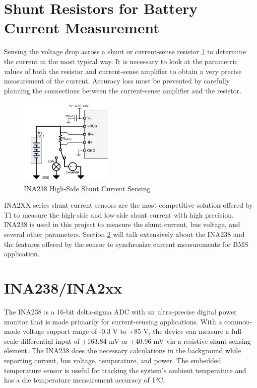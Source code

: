 \section{Shunt Resistors for Battery Current Measurement}
Sensing the voltage drop across a shunt or current-sense resistor \ref{fig:INA_high_side_currentsense} to determine the current in the most typical way. It is necessary to look at the parametric values of both the resistor and current-sense amplifier to obtain a very precise measurement of the current.
Accuracy loss must be prevented by carefully planning the connections between the current-sense amplifier and the resistor.
\begin{figure}[h]
	\centering
	\includegraphics[width=0.4\textwidth]{Chap05/Figures/INA_high_side_currentsense.PNG}
	\caption{ INA238 High-Side Shunt Current Sensing} 
	\label{fig:INA_high_side_currentsense}
\end{figure}

INA2XX series shunt current sensors are the most competitive solution offered by TI to measure the high-side and low-side shunt current with high precision. INA238 is used in this project to measure the shunt current, bus voltage, and several other parameters. Section \ref{sec:INA238} will talk extensively about the INA238 and the features offered by the sensor to synchronize current measurements for BMS application.
\section{INA238/INA2xx}\label{sec:INA238}
The INA238 is a 16-bit delta-sigma ADC with an ultra-precise digital power monitor that is made primarily for current-sensing applications. With a common-mode voltage support range of -0.3 V to +85 V, the device can measure a full-scale differential input of $\pm$163.84 mV or $\pm$40.96 mV via a resistive shunt sensing element.
The INA238 does the necessary calculations in the background while reporting current, bus voltage, temperature, and power. The embedded temperature sensor is useful for tracking the system's ambient temperature and has a die temperature measurement accuracy of 1°C.

